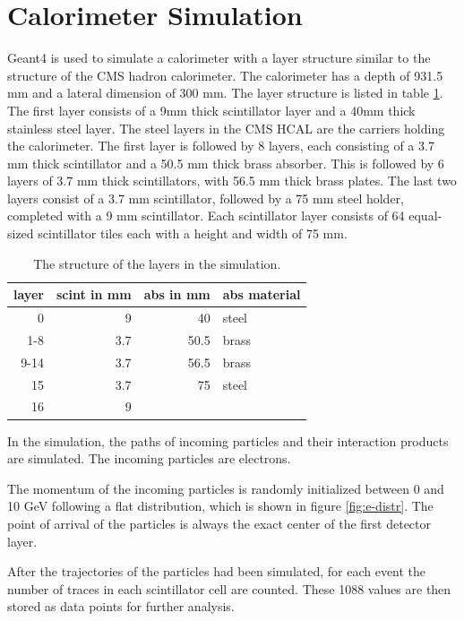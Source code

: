 \documentclass[12pt, a4paper]{thesis}
\begin{document}
\section{Calorimeter Simulation}
\label{sec:org905cdeb}

Geant4 \cite{geant_simul_toolkit} is used to simulate a calorimeter
with a layer structure similar to the structure of the CMS hadron
calorimeter. The calorimeter has a depth of 931.5 mm and a lateral
dimension of 300 mm. The layer structure is listed in table
\ref{fcn_structure}. The first layer consists of a 9mm thick
scintillator layer and a 40mm thick stainless steel layer. The steel
layers in the CMS HCAL are the carriers holding the calorimeter. The
first layer is followed by 8 layers, each consisting of a 3.7 mm thick
scintillator and a 50.5 mm thick brass absorber. This is followed by 6
layers of 3.7 mm thick scintillators, with 56.5 mm thick brass plates.
The last two layers consist of a 3.7 mm scintillator, followed by a 75
mm steel holder, completed with a 9 mm scintillator. Each scintillator
layer consists of 64 equal-sized scintillator tiles each with a height
and width of 75 mm.

\begin{table}[htbp]
  \centering
  \begin{tabular}{rrrl}
    layer & scint in mm & abs in mm & abs material\\
    \hline
    0 & 9 & 40 & steel\\
    1-8 & 3.7 & 50.5 & brass\\
    9-14 & 3.7 & 56.5 & brass\\
    15 & 3.7 & 75 & steel\\
    16 & 9 &  & \\
  \end{tabular}
  \caption{The structure of the layers in the simulation.}
  \label{fcn_structure}
\end{table}

In the simulation, the paths of incoming particles and their
interaction products are simulated. The incoming particles are
electrons.

The momentum of the incoming particles is randomly initialized between
0 and 10 GeV following a flat distribution, which is shown in
  figure \ref{fig:e-distr}. The point of arrival of the particles is
always the exact center of the first detector layer.

After the trajectories of the particles had been simulated, for each
event the number of traces in each scintillator cell are counted.
These 1088 values are then stored as data points for further analysis.
\end{document}
